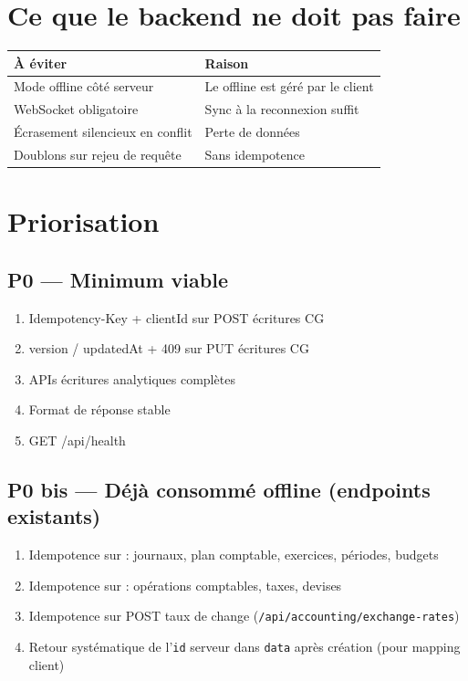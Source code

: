 \documentclass[12pt,a4paper]{report}
\begin{document}
\chapter{Ce que le backend ne doit pas faire}

\begin{longtable}{@{}p{5cm}p{7.5cm}@{}}
\hline
\textbf{À éviter} & \textbf{Raison} \\
\hline
\endhead
Mode offline côté serveur & Le offline est géré par le client \\
\hline
WebSocket obligatoire & Sync à la reconnexion suffit \\
\hline
Écrasement silencieux en conflit & Perte de données \\
\hline
Doublons sur rejeu de requête & Sans idempotence \\
\hline
\end{longtable}

\chapter{Priorisation}

\section{P0 --- Minimum viable}

\begin{enumerate}
  \item Idempotency-Key + clientId sur POST écritures CG
  \item version / updatedAt + 409 sur PUT écritures CG
  \item APIs écritures analytiques complètes
  \item Format de réponse stable
  \item GET /api/health
\end{enumerate}

\section{P0 bis --- Déjà consommé offline (endpoints existants)}

\begin{enumerate}
  \item Idempotence sur : journaux, plan comptable, exercices, périodes, budgets
  \item Idempotence sur : opérations comptables, taxes, devises
  \item Idempotence sur POST taux de change (\texttt{/api/accounting/exchange-rates})
  \item Retour systématique de l'\texttt{id} serveur dans \texttt{data} après création (pour mapping client)
\end{enumerate}
\end{document}
